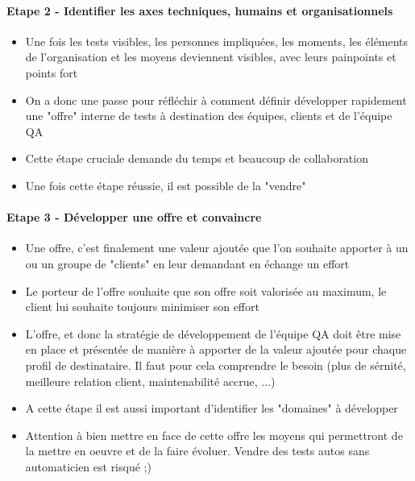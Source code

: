 \begin{frame}{\insertsectionhead}
  \framesubtitle{Etape 2 - Identifier les axes techniques, humains et organisationnels}
 
    \begin{itemize}
      \item Une fois les tests visibles, les personnes impliquées, les moments, les éléments de l'organisation et les moyens deviennent visibles, avec leurs painpoints et points fort
      \item On a donc une passe pour réfléchir à comment définir développer rapidement une "offre" interne de tests à destination des équipes, clients et de l'équipe QA
      \item Cette étape cruciale demande du temps et beaucoup de collaboration
       \item Une fois cette étape réussie, il est possible de la "vendre"
    \end{itemize}
\end{frame}

\begin{frame}{\insertsectionhead}
  \framesubtitle{Etape 3 - Développer une offre et convaincre}
    \begin{itemize}
      \item Une offre, c'est finalement une valeur ajoutée que l'on souhaite apporter à un ou un groupe de "clients" en leur demandant  en échange un effort
      \item Le porteur de l'offre souhaite que son offre soit valorisée au maximum, le client lui souhaite toujours minimiser son effort
      \item L'offre, et donc la stratégie de développement de l'équipe QA doit être mise en place et présentée de manière à apporter de la valeur ajoutée pour chaque profil de destinataire. Il faut pour cela comprendre le besoin (plus de sérnité, meilleure relation client, maintenabilité accrue, ...)
      \item A cette étape il est aussi important d'identifier les "domaines" à développer
      \item Attention à bien mettre en face de cette offre les moyens qui permettront de la mettre en oeuvre et de la faire évoluer. Vendre des tests autos sans automaticien est risqué ;)
    \end{itemize}
\end{frame}

